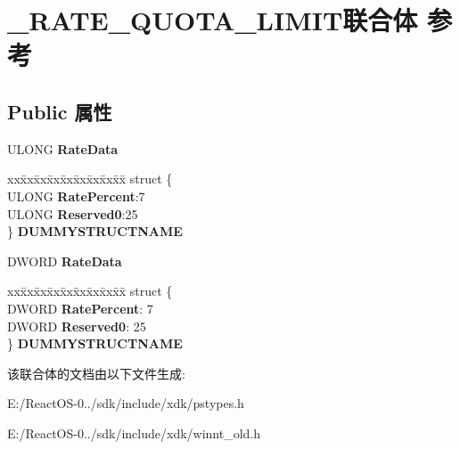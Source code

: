 \hypertarget{union___r_a_t_e___q_u_o_t_a___l_i_m_i_t}{}\section{\+\_\+\+R\+A\+T\+E\+\_\+\+Q\+U\+O\+T\+A\+\_\+\+L\+I\+M\+I\+T联合体 参考}
\label{union___r_a_t_e___q_u_o_t_a___l_i_m_i_t}
\subsection*{Public 属性}
\begin{DoxyCompactItemize}
\item 
\mbox{\label{union___r_a_t_e___q_u_o_t_a___l_i_m_i_t_a06ac2eb40827e6fd9de81d64bfd09994}} 
U\+L\+O\+NG {\bfseries Rate\+Data}
\item 
\mbox{\label{union___r_a_t_e___q_u_o_t_a___l_i_m_i_t_aeb7df2b44da496e9e20f04a0c41f756e}} 
\begin{tabbing}
xx\=xx\=xx\=xx\=xx\=xx\=xx\=xx\=xx\=\kill
struct \{\\
\>ULONG {\bfseries RatePercent}:7\\
\>ULONG {\bfseries Reserved0}:25\\
\} {\bfseries DUMMYSTRUCTNAME}\\

\end{tabbing}\item 
\mbox{\label{union___r_a_t_e___q_u_o_t_a___l_i_m_i_t_aedb3a08e3cc88c42de36c55521ca2ebd}} 
D\+W\+O\+RD {\bfseries Rate\+Data}
\item 
\mbox{\label{union___r_a_t_e___q_u_o_t_a___l_i_m_i_t_a66cab59d7d8ae25bce5e7ba2fcf57fa0}} 
\begin{tabbing}
xx\=xx\=xx\=xx\=xx\=xx\=xx\=xx\=xx\=\kill
struct \{\\
\>DWORD {\bfseries RatePercent}: 7\\
\>DWORD {\bfseries Reserved0}: 25\\
\} {\bfseries DUMMYSTRUCTNAME}\\

\end{tabbing}\end{DoxyCompactItemize}


该联合体的文档由以下文件生成\+:\begin{DoxyCompactItemize}
\item 
E\+:/\+React\+O\+S-\/0../sdk/include/xdk/pstypes.\+h\item 
E\+:/\+React\+O\+S-\/0../sdk/include/xdk/winnt\+\_\+old.\+h\end{DoxyCompactItemize}
